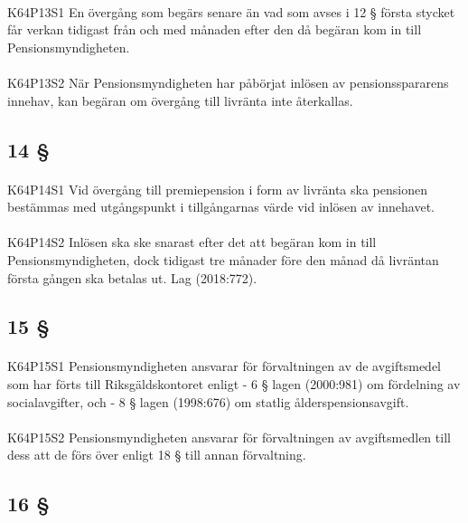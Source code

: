 \documentclass[a4paper,notitlepage,openany,10pt]{book}
\begin{document}
\paragraph*{}
{\tiny K64P13S1}
En övergång som begärs senare än vad som avses i 12 § första stycket får verkan tidigast från och med månaden efter den då begäran kom in till Pensionsmyndigheten.
\paragraph*{}
{\tiny K64P13S2}
När Pensionsmyndigheten har påbörjat inlösen av pensionsspararens innehav, kan begäran om övergång till livränta inte återkallas.
\subsection*{14 §}
\paragraph*{}
{\tiny K64P14S1}
Vid övergång till premiepension i form av livränta ska pensionen bestämmas med utgångspunkt i tillgångarnas värde vid inlösen av innehavet.
\paragraph*{}
{\tiny K64P14S2}
Inlösen ska ske snarast efter det att begäran kom in till Pensionsmyndigheten, dock tidigast tre månader före den månad då livräntan första gången ska betalas ut.
Lag (2018:772).
\subsection*{15 §}
\paragraph*{}
{\tiny K64P15S1}
Pensionsmyndigheten ansvarar för förvaltningen av de avgiftsmedel som har förts till Riksgäldskontoret enligt
\newline - 6 § lagen (2000:981) om fördelning av socialavgifter, och
\newline - 8 § lagen (1998:676) om statlig ålderspensionsavgift.
\paragraph*{}
{\tiny K64P15S2}
Pensionsmyndigheten ansvarar för förvaltningen av avgiftsmedlen till dess att de förs över enligt 18 § till annan förvaltning.
\subsection*{16 §}
\end{document}
